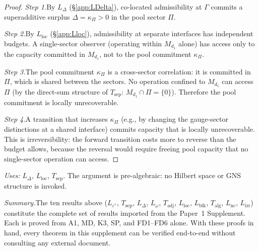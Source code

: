 \documentclass[11pt]{article}
\theoremstyle{definition}
\begin{document}
\begin{proof}
\textit{Step 1.}\quad By $L_\Delta$ (\S\ref{app:LDelta}), co-located
admissibility at $\Gamma$ commits a superadditive surplus
$\Delta = \kappa_\Pi > 0$ in the pool sector $\Pi$.

\textit{Step 2.}\quad By $L_{\mathrm{loc}}$ (\S\ref{app:Lloc}),
admissibility at separate interfaces has independent budgets.  A
single-sector observer (operating within $M_{d_1}$ alone) has access
only to the capacity committed in $M_{d_1}$, not to the pool
commitment $\kappa_\Pi$.

\textit{Step 3.}\quad The pool commitment $\kappa_\Pi$ is a
cross-sector correlation: it is committed in $\Pi$, which is shared
between the sectors.  No operation confined to $M_{d_1}$ can access
$\Pi$ (by the direct-sum structure of $T_{\mathrm{sep}}$:
$M_{d_1} \cap \Pi = \{0\}$).  Therefore the pool commitment is locally
unrecoverable.

\textit{Step 4.}\quad A transition that increases $\kappa_\Pi$ (e.g.,
by changing the gauge-sector distinctions at a shared interface) commits
capacity that is locally unrecoverable.  This is irreversibility: the
forward transition costs more to reverse than the budget allows, because
the reversal would require freeing pool capacity that no single-sector
operation can access.
\end{proof}

\noindent\textit{Uses:} $L_\Delta$, $L_{\mathrm{loc}}$,
$T_{\mathrm{sep}}$.  The argument is pre-algebraic: no Hilbert space
or GNS structure is invoked.

\medskip\noindent\textit{Summary.}\quad The ten results above
($L_{\varepsilon^*}$, $T_{\mathrm{sep}}$, $L_\Delta$, $L_\omega$,
$T_{\mathrm{adj}}$, $L_{\mathrm{loc}}$, $L_{\mathrm{blk}}$,
$T_{\mathrm{alg}}$, $L_{\mathrm{nc}}$, $L_{\mathrm{irr}}$) constitute
the complete set of results imported from the Paper~1 Supplement.  Each
is proved from A1, MD, K3, SP, and FD1--FD6 alone.  With these proofs
in hand, every theorem in this supplement can be verified end-to-end
without consulting any external document.
\end{document}
